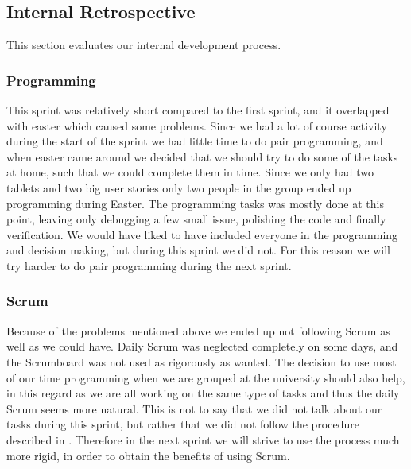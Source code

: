 \subsection{Internal Retrospective}\label{internal2}
This section evaluates our internal development process.

\subsubsection{Programming}
This sprint was relatively short compared to the first sprint, and it overlapped with easter which caused some problems.
Since we had a lot of course activity during the start of the sprint we had little time to do pair programming, and when easter came around we decided that we should try to do some of the tasks at home, such that we could complete them in time.
Since we only had two tablets and two big user stories only two people in the group ended up programming during Easter.
The programming tasks was mostly done at this point, leaving only debugging a few small issue, polishing the code and finally verification.
We would have liked to have included everyone in the programming and decision making, but during this sprint we did not.
For this reason we will try harder to do pair programming during the next sprint.

\subsubsection{Scrum}
Because of the problems mentioned above we ended up not following Scrum as well as we could have.
Daily Scrum was neglected completely on some days, and the Scrumboard was not used as rigorously as wanted.
The decision to use most of our time programming when we are grouped at the university should also help, in this regard as we are all working on the same type of tasks and thus the daily Scrum seems more natural.
This is not to say that we did not talk about our tasks during this sprint, but rather that we did not follow the procedure described in .
Therefore in the next sprint we will strive to use the process much more rigid, in order to obtain the benefits of using Scrum.
